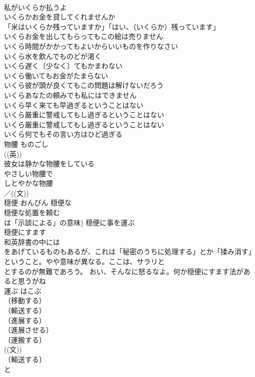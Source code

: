 \documentclass[8pt]{extreport}
\begin{document}
\begin{CJK}{UTF8}{min}
\\	私がいくらか払うよ 
\\	いくらかお金を貸してくれませんか 
\\	「米はいくらか残っていますか」「はい、（いくらか）残っています」 
\\	いくらお金を出してもらってもこの絵は売りません 
\\	いくら時間がかかってもよいからいいものを作りなさい 
\\	いくら水を飲んでものどが渇く 
\\	いくら遅く〔少なく〕てもかまわない 
\\	いくら働いてもお金がたまらない 
\\	いくら彼が頭が良くてもこの問題は解けないだろう 
\\	いくらあなたの頼みでも私にはできません 
\\	いくら早く来ても早過ぎるということはない 
\\	いくら厳重に警戒してもし過ぎるということはない 
\\	いくら厳重に警戒してもし過ぎるということはない 
\\	いくら何でもその言い方はひど過ぎる 
\\	物腰	ものごし	
\\	((英)) 
\\	彼女は静かな物腰をしている 
\\	やさしい物腰で 
\\	しとやかな物腰 
\\	／((文))
\\	穏便	おんびん	穏便な 
\\	穏便な処置を頼む 
\\	は「示談による」の意味) 穏便に事を運ぶ 
\\	穏便にすます　
\\	和英辞書の中には
\\	をあげているものもあるが、これは「秘密のうちに処理する」とか「揉み消す」ということ。やや意味が異なる。ここは、サラリと
\\	とするのが無難であろう。 おい、そんなに怒るなよ。何か穏便にすます法があると思うがね 
\\	運ぶ	はこぶ	
\\	（移動する）
\\	（輸送する）
\\	（進展する）
\\	（進展させる）
\\	〔運搬する〕
\\	((文)) 
\\	〔輸送する〕
\\	と

\end{CJK}
\end{document}
